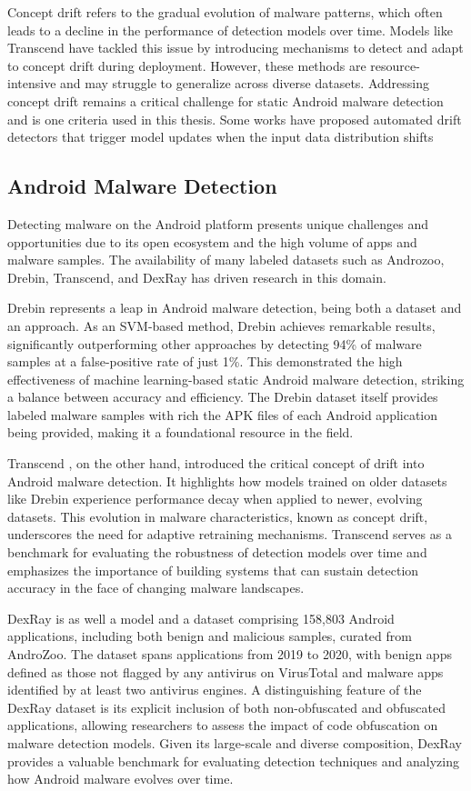 Concept drift refers to the gradual evolution of malware patterns, which often leads to a decline in the performance of detection models over time.
Models like Transcend \cite{transcend} have tackled this issue by introducing mechanisms to detect and adapt to concept drift during deployment.
However, these methods are resource-intensive and may struggle to generalize across diverse datasets.
Addressing concept drift remains a critical challenge for static Android malware detection and is one criteria used in this thesis.
Some works have proposed automated drift detectors that trigger model updates when the 
input data distribution shifts
\cite{morph}

\subsection{Android Malware Detection}
\label{sec:amd}
Detecting malware on the Android platform presents unique challenges and opportunities due to its open ecosystem and the high volume of apps and malware samples. The availability of many labeled datasets such as Androzoo, Drebin, Transcend, and DexRay has driven research in this domain.

Drebin \cite{drebin} represents a leap in Android malware detection, being both a dataset and an approach. 
As an SVM-based method, Drebin achieves remarkable results, significantly outperforming other 
approaches by detecting 94\% of malware samples at a false-positive rate of just 1\%. 
This demonstrated the high effectiveness of machine learning-based static Android malware detection, 
striking a balance between accuracy and efficiency. 
The Drebin dataset itself provides labeled malware samples with rich the APK files of each Android 
application being provided, making it a foundational resource in the field.

Transcend \cite{transcend}, on the other hand, introduced the critical concept of drift into 
Android malware detection.
It highlights how models trained on older datasets like Drebin experience performance decay when 
applied to newer, evolving datasets.
This evolution in malware characteristics, known as concept drift, underscores the need 
for adaptive retraining mechanisms.
Transcend serves as a benchmark for evaluating the robustness of detection models over time 
and emphasizes the importance of building systems that can sustain detection accuracy in the 
face of changing malware landscapes.

DexRay \cite{dexray} is as well a model and a dataset comprising 158,803 Android applications, 
including both benign and malicious samples, curated from AndroZoo. 
The dataset spans applications from 2019 to 2020, with benign apps defined as those not flagged 
by any antivirus on VirusTotal and malware apps identified by at least two antivirus engines. 
A distinguishing feature of the DexRay dataset is its explicit inclusion of both non-obfuscated 
and obfuscated applications, allowing researchers to assess the impact of code obfuscation on 
malware detection models. Given its large-scale and diverse composition, 
DexRay provides a valuable benchmark for evaluating detection techniques and analyzing how 
Android malware evolves over time.

